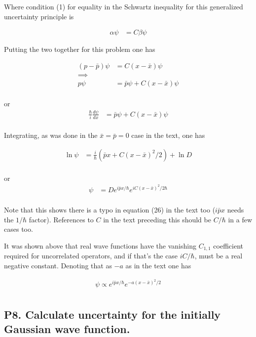 \documentclass{article}
\begin{document}
Where condition (1) for equality in the Schwartz inequality for this 
generalized uncertainty principle is

\begin{align*}
\alpha \psi &= C \beta \psi
\end{align*}

Putting the two together for this problem one has

\begin{align*}
(p - \bar{p}) \psi &= C (x - \bar{x}) \psi \\
\implies \\
p \psi &= \bar{p} \psi + C (x - \bar{x}) \psi \\
\end{align*}

or
\begin{align*}
\frac{\hbar}{i} \frac{d\psi}{dx} &= \bar{p} \psi + C (x - \bar{x}) \psi \\
\end{align*}

Integrating, as was done in the $\bar{x} = \bar{p} = 0$ case in the text, 
one has

\begin{align*}
\ln \psi &= \frac{i}{\hbar}( \bar{p} x + C (x - \bar{x})^2/2 ) + \ln D \\
\end{align*}

or
\begin{align*}
\psi &= D e^{i\bar{p} x/\hbar} e^{ i C (x - \bar{x})^2/2\hbar } \\
\end{align*}

Note that this shows there is a typo in equation (26) in the text too ($i\bar{p} x$ needs the $1/\hbar$ factor).  References to $C$ in the text preceding this should be $C/\hbar$ in a few cases too.

It was shown above that real wave functions have the vanishing $C_{1,1}$ coefficient required for uncorrelated operators, and if that's the case $i C/\hbar$, must be a real negative constant.  Denoting that as $-a$ as in the text one has

\begin{align*}
\psi \propto e^{i\bar{p} x/\hbar} e^{ -a(x - \bar{x})^2/2} \\
\end{align*}

\subsection{ P8. Calculate uncertainty for the initially Gaussian wave function. }
\end{document}
